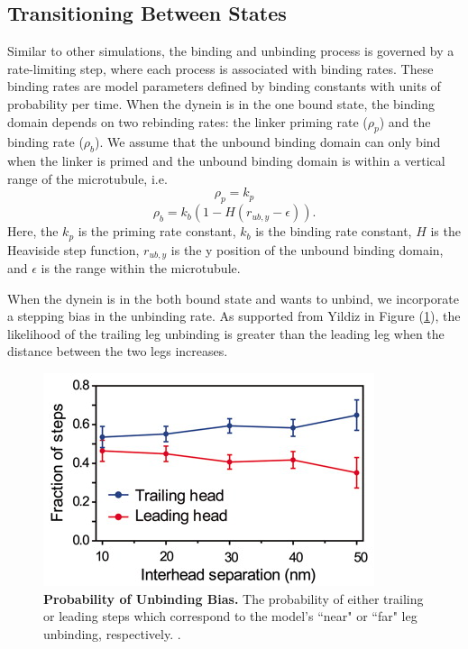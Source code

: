 \subsection{Transitioning Between States}

Similar to other simulations, the binding and unbinding process is governed by a rate-limiting step, where each process is associated with binding rates. These binding rates are model parameters defined by binding constants with units of probability per time. When the dynein is in the one bound state, the binding domain depends on two rebinding rates: the linker priming rate ($\rho_p$) and the binding rate ($\rho_b$). We assume that the unbound binding domain can only bind when the linker is primed and the unbound binding domain is within a vertical range of the microtubule, i.e.
\begin{equation}
	\rho_p=k_p
\end{equation}
\begin{equation}
	\rho_b=k_b(1-H(r_{ub,y}-\epsilon)).
\end{equation} 
Here, the $k_p$ is the priming rate constant, $k_b$ is the binding rate constant, $H$ is the Heaviside step function, $r_{ub,y}$ is the y position of the unbound binding domain, and $\epsilon$ is the range within the microtubule.

When the dynein is in the both bound state and wants to unbind, we incorporate a stepping bias in the unbinding rate. As supported from Yildiz in Figure (\ref{fig:trailingbias}), the likelihood of the trailing leg unbinding is greater than the leading leg when the distance between the two legs increases. 


\begin{figure}[H]
	\centering
	\includegraphics[width=0.6\columnwidth]{Figures/trailingbias.png}
	\caption[Probability of Unbinding Bias]{\textbf{Probability of Unbinding Bias.} The probability of either trailing or leading steps which correspond to the model's ``near" or ``far" leg unbinding, respectively. \cite{Dewitt2012}.}
	\label{fig:trailingbias}
\end{figure}

